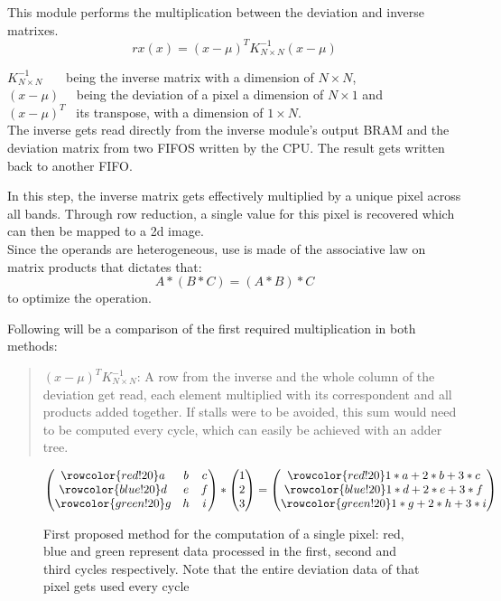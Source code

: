\noindent This module performs the multiplication between the deviation and inverse matrixes.
\[ rx(x) = (x-\mu)^{T} K^{-1}_{N \times N} (x-\mu) \]


\indent \(K^{-1}_{N \times N}\) \ \ \ being the inverse matrix with a dimension of \(N \times N\),\\
\indent \((x-\mu)\) \ \	being the deviation of a pixel a dimension of \(N \times 1\) and \\			
\indent \((x-\mu)^{T}\) \ its transpose, with a dimension of \(1 \times N\).\\

The inverse gets read directly from the inverse module's output BRAM and the deviation matrix from two  FIFOS written by the CPU. The result gets written back to another FIFO.

In this step, the inverse matrix gets effectively multiplied by a unique pixel across all bands. Through row reduction, a single value for this pixel is recovered which can then be mapped to a 2d image.\\

Since the operands are heterogeneous, use is made of the associative law on matrix products that dictates that:
	\[A * (B * C) = (A * B) * C\]
	to optimize the operation.\\


\newcommand\rb{\colorbox{red!20}}
\newcommand\bb{\colorbox{blue!20}}
\newcommand\gb{\colorbox{green!20}}
\newcommand\rr{\rowcolor{red!20}}
\newcommand\br{\rowcolor{blue!20}}
\newcommand\gr{\rowcolor{green!20}}

\noindent Following will be a comparison of the first required multiplication in both methods:
\begin{quote}
	\((x-\mu)^{T} K^{-1}_{N \times N}\):	
	A row from the inverse and the whole column of the deviation get read, each element multiplied with its correspondent and all products added together. If stalls were to be avoided, this sum would need to be computed every cycle, which can easily be achieved with an adder tree.
\end{quote}

\begin{figure}[h]%
\[
\begin{pmatrix}
\rr a & b & c \\ 
\br d & e & f \\ 
\gr g & h & i
\end{pmatrix}
*
\begin{pmatrix}
1\\
2\\
3
\end{pmatrix}
=
\begin{pmatrix}
\rr 1*a+2*b+3*c\\
\br 1*d+2*e+3*f\\
\gr 1*g+2*h+3*i
\end{pmatrix} 
\]
\caption[Optional: Short caption to appear in List of Figures]{First proposed method for the computation of a single pixel: red, blue and green represent data processed in the first, second and third cycles respectively. Note that the entire deviation data of that pixel gets used every cycle}
\end{figure}
\pagebreak
		
